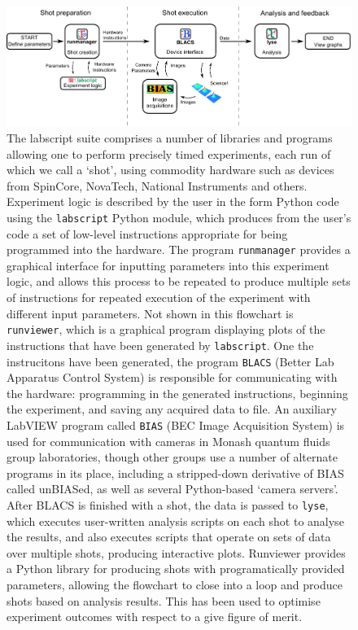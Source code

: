 \begin{figure}
\begin{center}
\includegraphics[width=\textwidth]{figures/software/flow_chart_simple-eps-converted-to.pdf}
\caption{The labscript suite comprises a number of libraries and programs allowing one to perform precisely timed experiments, each run of which we call a `shot', using commodity hardware such as devices from SpinCore, NovaTech, National Instruments and others. Experiment logic is described by the user in the form Python code using the \texttt{labscript} Python module, which produces from the user's code a set of low-level instructions appropriate for being programmed into the hardware. The program \texttt{runmanager} provides a graphical interface for inputting parameters into this experiment logic, and allows this process to be repeated to produce multiple sets of instructions for repeated execution of the experiment with different input parameters. Not shown in this flowchart is \texttt{runviewer}, which is a graphical program displaying plots of the instructions that have been generated by \texttt{labscript}. One the instrucitons have been generated, the program \texttt{BLACS} (Better Lab Apparatus Control System) is responsible for communicating with the hardware: programming in the generated instructions, beginning the experiment, and saving any acquired data to file. An auxiliary LabVIEW program called \texttt{BIAS} (BEC Image Acquisition System) is used for communication with cameras in Monash quantum fluids group laboratories, though other groups use a number of alternate programs in its place, including a stripped-down derivative of BIAS called unBIASed, as well as several Python-based `camera servers'. After BLACS is finished with a shot, the data is passed to \texttt{lyse}, which executes user-written analysis scripts on each shot to analyse the results, and also executes scripts that operate on sets of data over multiple shots, producing interactive plots. Runviewer provides a Python library for producing shots with programatically provided parameters, allowing the flowchart to close into a loop and produce shots based on analysis results. This has been used to optimise experiment outcomes with respect to a give figure of merit.}\label{fig:labscript_flowchart}
\end{center}
\end{figure}

